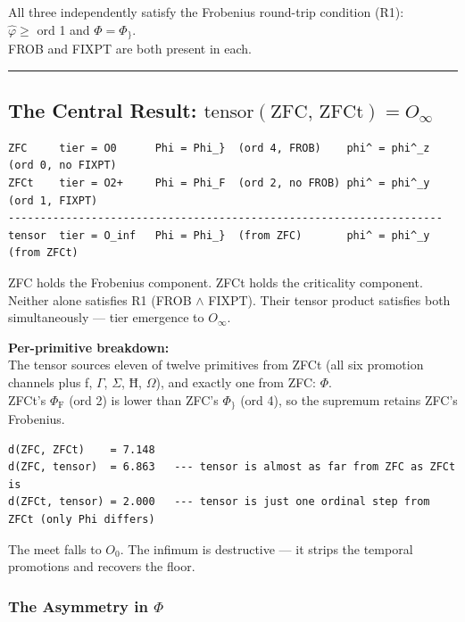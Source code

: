\documentclass[12pt,a4paper]{article}
\begin{document}
All three independently satisfy the Frobenius round-trip condition (R1): \\
$\hat{\varphi} \geq$ ord 1 and $\Phi = \Phi_{\}}$. \\
FROB and FIXPT are both present in each.

\begin{center}
\rule{0.5\textwidth}{0.4pt}
\end{center}

\subsection*{The Central Result: $\mathrm{tensor}(\mathrm{ZFC},\,\mathrm{ZFCt}) = O_\infty$}

\begin{lstlisting}
ZFC     tier = O0      Phi = Phi_}  (ord 4, FROB)    phi^ = phi^_z  (ord 0, no FIXPT)
ZFCt    tier = O2+     Phi = Phi_F  (ord 2, no FROB) phi^ = phi^_y  (ord 1, FIXPT)
--------------------------------------------------------------------
tensor  tier = O_inf   Phi = Phi_}  (from ZFC)       phi^ = phi^_y  (from ZFCt)
\end{lstlisting}

ZFC holds the Frobenius component. ZFCt holds the criticality component. \\
Neither alone satisfies R1 (FROB $\land$ FIXPT). Their tensor product satisfies both simultaneously --- tier emergence to $O_\infty$.

\textbf{Per-primitive breakdown:} \\
The tensor sources eleven of twelve primitives from ZFCt (all six promotion channels plus ƒ, $\Gamma$, $\Sigma$, Ħ, $\Omega$), and exactly one from ZFC: $\Phi$. \\
ZFCt's $\Phi_{\text{F}}$ (ord 2) is lower than ZFC's $\Phi_{\}}$ (ord 4), so the supremum retains ZFC's Frobenius.

\begin{lstlisting}
d(ZFC, ZFCt)    = 7.148
d(ZFC, tensor)  = 6.863   --- tensor is almost as far from ZFC as ZFCt is
d(ZFCt, tensor) = 2.000   --- tensor is just one ordinal step from ZFCt (only Phi differs)
\end{lstlisting}

The meet falls to $O_0$. The infimum is destructive --- it strips the temporal promotions and recovers the floor.

\subsubsection*{The Asymmetry in $\Phi$}
\end{document}
